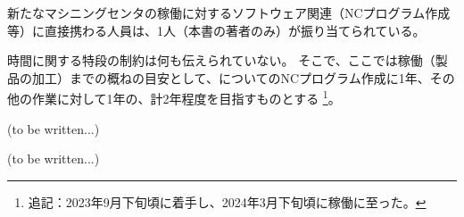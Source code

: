 






新たなマシニングセンタの稼働に対するソフトウェア関連（NCプログラム作成等）に直接携わる人員は、1人（本書の著者のみ）が振り当てられている。



時間に関する特段の制約は何も伝えられていない。
そこで、ここでは稼働（製品の加工）までの概ねの目安として、\Dimple についてのNCプログラム作成に1年、その他の作業に対して1年の、計2年程度を目指すものとする
\footnote{追記：2023年9月下旬頃に着手し、2024年3月下旬頃に稼働に至った。}。




(to be written...)







(to be written...)

\begin{appendices}
\end{appendices}

